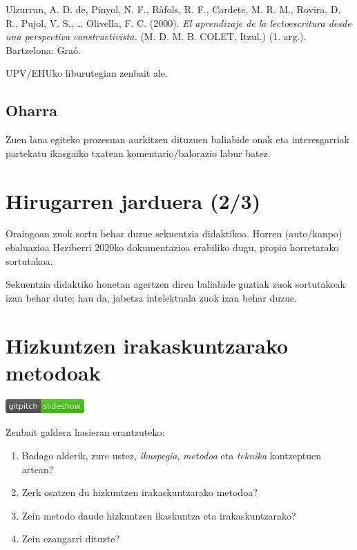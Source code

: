 \documentclass[
]{book}
\providecommand{\tightlist}{%
  \setlength{\itemsep}{0pt}\setlength{\parskip}{0pt}}
\begin{document}
Ulzurrun, A. D. de, Pinyol, N. F., Ràfols, R. F., Cardete, M. R. M., Rovira, D. R., Pujol, V. S., \ldots{} Olivella, F. C. (2000). \emph{El aprendizaje de la lectoescritura desde una perspectiva constructivista.} (M. D. M. B. COLET, Itzul.) (1. arg.). Bartzelona: Graó.

UPV/EHUko liburutegian zenbait ale.

\hypertarget{oharra}{%
\section{Oharra}\label{oharra}}

Zuen lana egiteko prozesuan aurkitzen dituzuen baliabide onak eta interesgarriak partekatu ikasgaiko txatean komentario/balorazio labur batez.

\hypertarget{hirugarren-jarduera-23}{%
\chapter*{Hirugarren jarduera (2/3)}\label{hirugarren-jarduera-23}}

Oraingoan zuok sortu behar duzue sekuentzia didaktikoa. Horren (auto/kanpo) ebaluazioa Heziberri 2020ko dokumentazioa erabiliko dugu, propio horretarako sortutakoa.

Sekuentzia didaktiko honetan agertzen diren baliabide guztiak zuok sortutakoak izan behar dute; hau da, jabetza intelektuala zuok izan behar duzue.

\hypertarget{hizkuntzen-irakaskuntzarako-metodoak}{%
\chapter{Hizkuntzen irakaskuntzarako metodoak}\label{hizkuntzen-irakaskuntzarako-metodoak}}

\href{../Diapoak/05_Metodoak.html}{\includegraphics{assets/badge.png}}

Zenbait galdera hasieran erantzuteko:

\begin{enumerate}
\def\labelenumi{\arabic{enumi}.}
\tightlist
\item
  Badago alderik, zure ustez, \emph{ikuspegia}, \emph{metodoa} eta \emph{teknika} kontzeptuen artean?
\item
  Zerk osatzen du hizkuntzen irakaskuntzarako metodoa?
\item
  Zein metodo daude hizkuntzen ikaskuntza eta irakaskuntzarako?
\item
  Zein ezaugarri dituzte?
\end{enumerate}
\end{document}
